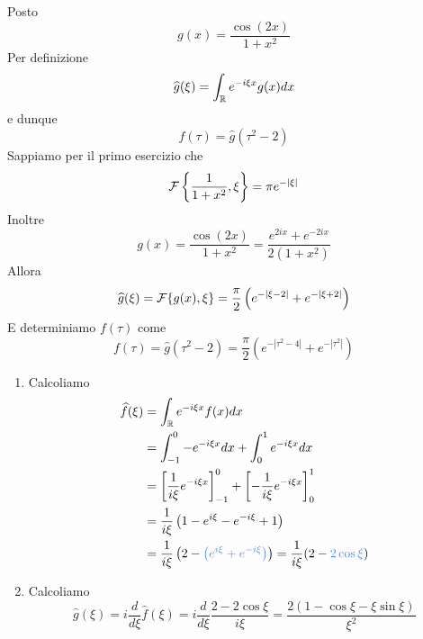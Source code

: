 Posto
\begin{equation*}
g(x) = \frac{\cos(2x)}{1 + x^{2}}
\end{equation*}
Per definizione
\begin{equation*}
\widehat{g}(\xi) = \int _{\mathbb{R} } e^{ - i\xi x} g(x) dx
\end{equation*}
e dunque
\begin{equation*}
f(\tau) = \hat{g}\left(\tau ^{2} - 2\right)
\end{equation*}
Sappiamo per il primo esercizio che
\begin{equation*}
\mathcal{F} \left\{\frac{1}{1 + x^{2}} ,\xi \right\} = \pi e^{ - | \xi | }
\end{equation*}
Inoltre
\begin{equation*}
g(x) = \frac{\cos(2x)}{1 + x^{2}} = \frac{e^{2ix} + e^{ - 2ix}}{2\left(1 + x^{2}\right)}
\end{equation*}
Allora
\begin{equation*}
\widehat{g}(\xi) = \mathcal{F} \{g(x) ,\xi \} = \frac{\pi }{2}\left(e^{ - | \xi - 2| } + e^{ - | \xi + 2| }\right)
\end{equation*}
E determiniamo $f(\tau)$ come
\begin{equation*}
f(\tau) = \hat{g}\left(\tau ^{2} - 2\right) = \frac{\pi }{2}\left(e^{ - \left| \tau ^{2} - 4\right| } + e^{ - \left| \tau ^{2}\right| }\right)
\end{equation*}
\Soluzione
\begin{enumerate}
\item Calcoliamo\begin{equation*}
\begin{aligned}
\hat{f}(\xi) & = \int _{\RR } e^{ - i\xi x} f(x) dx\\
 & = \int ^{0}_{ - 1} - e^{ - i\xi x} dx + \int ^{1}_{0} e^{ - i\xi x} dx\\
 & = \left[\frac{1}{i\xi } e^{ - i\xi x}\right]^{0}_{ - 1} + \left[ - \frac{1}{i\xi } e^{ - i\xi x}\right]^{1}_{0}\\
 & = \frac{1}{i\xi }\left(1 - e^{i\xi } - e^{ - i\xi } + 1\right)\\
 & = \frac{1}{i\xi }\left(2 - \textcolor[rgb]{0.29,0.56,0.89}{\left(e^{i\xi } + e^{ - i\xi }\right)}\right) = \frac{1}{i\xi }(2 - \textcolor[rgb]{0.29,0.56,0.89}{2\cos\xi })
\end{aligned}
\end{equation*}
\item Calcoliamo\begin{equation*}
\hat{g}(\xi) = i\frac{d}{d\xi }\hat{f}(\xi) = i\frac{d}{d\xi }\frac{2 - 2\cos \xi }{i\xi } = \frac{2(1 - \cos \xi - \xi \sin \xi)}{\xi ^{2}}
\end{equation*}
\end{enumerate}
\Soluzione

